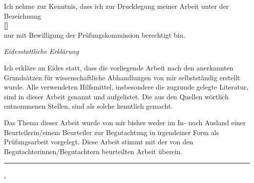 




\thispagestyle{empty} %

\begin{center}
\normalsize{Ich nehme zur Kenntnis, dass ich zur Drucklegung meiner Arbeit unter der Bezeichnung}\\
\Large{\textbf{[\cmdKV@TitleMWBW@type]}}\\

\normalsize{nur mit Bewilligung der Prüfungskommission berechtigt bin.}
\end{center}
\vspace{\fill}
\textit{\large{Eidesstattliche Erklärung}}

Ich erkläre an Eides statt, dass die vorliegende Arbeit nach den anerkannten Grundsätzen für wissenschaftliche Abhandlungen von mir selbstständig erstellt wurde. Alle verwendeten Hilfsmittel, insbesondere die zugrunde gelegte Literatur, sind in dieser Arbeit genannt und aufgelistet. Die aus den Quellen wörtlich entnommenen Stellen, sind als solche kenntlich gemacht.

Das Thema dieser Arbeit wurde von mir bisher weder im In- noch Ausland einer Beurteilerin/einem Beurteiler zur Begutachtung in irgendeiner Form als Prüfungsarbeit vorgelegt. Diese Arbeit stimmt mit der von den Begutachterinnen/Begutachtern beurteilten Arbeit überein.



\vspace{1,5 cm} 

\noindent\hfill\rule{5cm}{.4pt}\par
\noindent \cmdKV@TitleMWBW@location , \cmdKV@TitleMWBW@date \hfill \cmdKV@TitleMWBW@authorPreTitle ~
\cmdKV@TitleMWBW@authorFirstname ~ \cmdKV@TitleMWBW@authorLastname ~
\cmdKV@TitleMWBW@authorPostTitle

\clearpage

